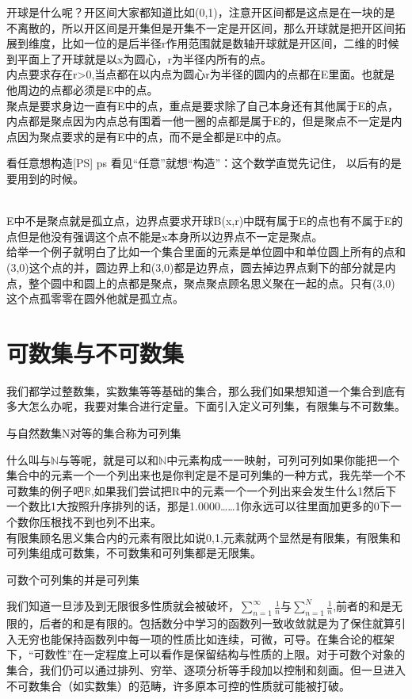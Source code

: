 \documentclass[lang=cn,10pt]{elegantbook}
\begin{document}
\begin{remark}
    开球是什么呢？开区间大家都知道比如(0,1)，注意开区间都是这点是在一块的是不离散的，所以开区间是开集但是开集不一定是开区间，那么开球就是把开区间拓展到维度，比如一位的是后半径r作用范围就是数轴开球就是开区间，二维的时候到平面上了开球就是以x为圆心，r为半径内所有的点。\\内点要求存在r>0,当点都在以内点为圆心r为半径的圆内的点都在E里面。也就是他周边的点都必须是E中的点。\\聚点是要求身边一直有E中的点，重点是要求除了自己本身还有其他属于E的点，内点都是聚点因为内点总有围着一他一圈的点都是属于E的，但是聚点不一定是内点因为聚点要求的是有E中的点，而不是全都是E中的点。\\
    \begin{dxtips}{看任意想构造}[PS]\label{dx:any-construct}
ps 看见“任意”就想“构造”：这个数学直觉先记住，  
以后有的是要用到的时候。
\end{dxtips}
\\E中不是聚点就是孤立点，边界点要求开球B(x,r)中既有属于E的点也有不属于E的点但是他没有强调这个点不能是x本身所以边界点不一定是聚点。\\给举一个例子就明白了比如一个集合里面的元素是单位圆中和单位圆上所有的点和(3,0)这个点的并，圆边界上和(3,0)都是边界点，圆去掉边界点剩下的部分就是内点，整个圆中和圆上的点都是聚点，聚点聚点顾名思义聚在一起的点。只有(3,0)这个点孤零零在圆外他就是孤立点。
\end{remark}

\section{可数集与不可数集}
我们都学过整数集，实数集等等基础的集合，那么我们如果想知道一个集合到底有多大怎么办呢，我要对集合进行定量。下面引入定义可列集，有限集与不可数集。
\begin{definition}
    与自然数集N对等的集合称为可列集
\end{definition}
什么叫与$\mathbb{N}$与等呢，就是可以和$\mathbb{N}$中元素构成一一映射，可列可列如果你能把一个集合中的元素一个一个列出来也是你判定是不是可列集的一种方式，我先举一个不可数集的例子吧$\mathbb{R}$,如果我们尝试把R中的元素一个一个列出来会发生什么1然后下一个数比1大按照升序排列的话，那是1.0000……1你永远可以往里面加更多的0下一个数你压根找不到也列不出来。\\
有限集顾名思义集合内的元素有限比如说{0,1},元素就两个显然是有限集，有限集和可列集组成可数集，不可数集和可列集都是无限集。
\begin{theorem}
    可数个可列集的并是可列集
\end{theorem}
我们知道一旦涉及到无限很多性质就会被破坏，$\sum_{n=1}^{\infty}\frac{1}{n}$与$
  \sum_{n=1}^{N} \frac{1}{n}$,前者的和是无限的，后者的和是有限的。包括数分中学习的函数列一致收敛就是为了保住就算引入无穷也能保持函数列中每一项的性质比如连续，可微，可导。在集合论的框架下，“可数性”在一定程度上可以看作是保留结构与性质的上限。对于可数个对象的集合，我们仍可以通过排列、穷举、逐项分析等手段加以控制和刻画。但一旦进入不可数集合（如实数集）的范畴，许多原本可控的性质就可能被打破。
\end{document}
